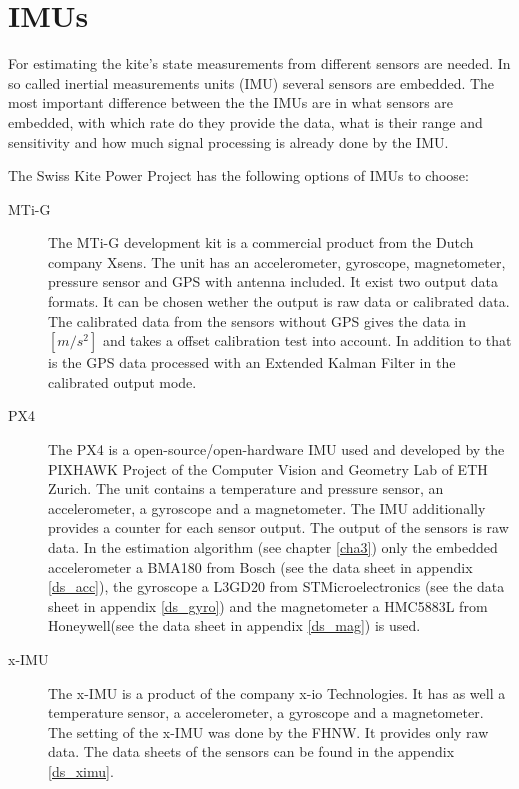 \chapter{IMUs}\label{cha2}

For estimating the kite's state measurements from different sensors are needed. In so called inertial measurements units (IMU)  several sensors are embedded. The most important difference between the the IMUs are in what sensors are embedded, with which rate do they provide the data, what is their range and sensitivity and how much signal processing is already done by the IMU.

The Swiss Kite Power Project has the following options of IMUs to choose:

\begin{description}
\item[MTi-G]
The MTi-G development kit is a commercial product from the Dutch company Xsens. The unit has an accelerometer, gyroscope, magnetometer, pressure sensor and GPS with antenna included. It exist two output data formats. It can be chosen wether the output is raw data or calibrated data. The calibrated data from the sensors without GPS gives the data in $[m/s^2]$ and takes a offset calibration test into account. In addition to that is the GPS data processed with an Extended  Kalman Filter in the calibrated output mode.

\item[PX4]
The PX4 is a open-source/open-hardware IMU used and developed by the PIXHAWK Project of the Computer Vision and Geometry Lab of ETH Zurich. The unit contains a temperature and pressure sensor, an accelerometer, a gyroscope and a magnetometer. The IMU additionally provides a counter for each sensor output. The output of the sensors is raw data. In the estimation algorithm (see chapter \ref{cha3}) only the embedded accelerometer a BMA180 from Bosch (see the data sheet in appendix \ref{ds_acc}), the gyroscope a L3GD20 from STMicroelectronics (see the data sheet in appendix \ref {ds_gyro}) and the magnetometer a HMC5883L from Honeywell(see the data sheet in appendix \ref{ds_mag}) is used.

\item[x-IMU]
The x-IMU is a product of the company x-io Technologies. It has as well a temperature sensor, a accelerometer, a gyroscope and a magnetometer. The setting of the x-IMU was done by the FHNW. It provides only raw data. The data sheets of the sensors can be found in the appendix \ref{ds_ximu}.
\end{description}


